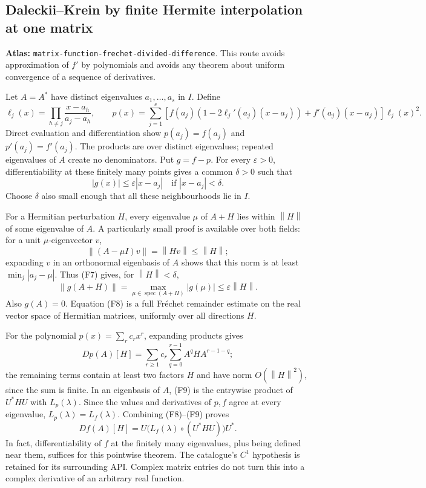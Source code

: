 \documentclass[11pt,a4paper]{article}
\newcommand{\norm}[1]{\left\lVert#1\right\rVert}
\DeclareRobustCommand{\code}[1]{{\footnotesize\urlstyle{tt}\nolinkurl{#1}}}
\begin{document}
\subsection{Daleckii--Krein by finite Hermite interpolation at one matrix}
\label{sec:matrix-function-frechet-divided-difference}
\textbf{Atlas:} \code{matrix-function-frechet-divided-difference}.
This route avoids approximation of $f'$ by polynomials and avoids any theorem
about uniform convergence of a sequence of derivatives.

Let $A=A^*$ have distinct eigenvalues $a_1,\ldots,a_s$ in $I$. Define
\[
 \ell_j(x)=\prod_{h\ne j}\frac{x-a_h}{a_j-a_h},\qquad
 p(x)=\sum_{j=1}^s\left[
 f(a_j)(1-2\ell_j'(a_j)(x-a_j))+f'(a_j)(x-a_j)
 \right]\ell_j(x)^2.                                           \tag{F6}
\]
Direct evaluation and differentiation show
$p(a_j)=f(a_j)$ and $p'(a_j)=f'(a_j)$. The products are over distinct
eigenvalues; repeated eigenvalues of $A$ create no denominators. Put $g=f-p$.
For every $\varepsilon>0$, differentiability at these finitely many points
gives a common $\delta>0$ such that
\[
 |g(x)|\le\varepsilon|x-a_j|\quad\text{if }|x-a_j|<\delta.       \tag{F7}
\]
Choose $\delta$ also small enough that all these neighbourhoods lie in $I$.

For a Hermitian perturbation $H$, every eigenvalue $\mu$ of $A+H$ lies
within $\norm H$ of some eigenvalue of $A$. A particularly small proof is
available over both fields: for a unit $\mu$-eigenvector $v$,
\[
 \norm{(A-\mu I)v}=\norm{Hv}\le\norm H;
\]
expanding $v$ in an orthonormal eigenbasis of $A$ shows that this norm is
at least $\min_j|a_j-\mu|$. Thus (F7) gives, for $\norm H<\delta$,
\[
 \norm{g(A+H)}=\max_{\mu\in\operatorname{spec}(A+H)}|g(\mu)|
 \le\varepsilon\norm H.                                      \tag{F8}
\]
Also $g(A)=0$. Equation (F8) is a full Fr\'echet remainder estimate on the
real vector space of Hermitian matrices, uniformly over all directions $H$.

For the polynomial $p(x)=\sum_r c_rx^r$, expanding products gives
\[
 Dp(A)[H]=\sum_{r\ge1}c_r\sum_{q=0}^{r-1}A^qHA^{r-1-q};        \tag{F9}
\]
the remaining terms contain at least two factors $H$ and have norm
$O(\norm H^2)$, since the sum is finite. In an eigenbasis of $A$, (F9) is
the entrywise product of $U^*HU$ with $L_p(\lambda)$. Since the values and
derivatives of $p,f$ agree at every eigenvalue, $L_p(\lambda)=L_f(\lambda)$.
Combining (F8)--(F9) proves
\[
 Df(A)[H]=U\bigl(L_f(\lambda)\circ(U^*HU)\bigr)U^*.
\]
In fact, differentiability of $f$ at the finitely many eigenvalues, plus
being defined near them, suffices for this pointwise theorem. The catalogue's
$C^1$ hypothesis is retained for its surrounding API. Complex matrix entries
do not turn this into a complex derivative of an arbitrary real function.
\end{document}
